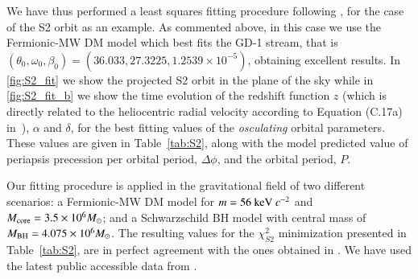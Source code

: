 \documentclass[twocolumn]{aa}
\begin{document}
We have thus performed a least squares fitting procedure following \cite{2020A&A...641A..34B}, for the case of the S2 orbit as an example. As commented above, in this case we use the Fermionic-MW DM model which best fits the GD-1 stream, that is $(\theta_0, \omega_0, \beta_0)= (36.033, 27.3225, 1.2539\times10^{-5})$, obtaining excellent results. In \cref{fig:S2_fit}  we show the projected S2 orbit in the plane of the sky while in \cref{fig:S2_fit_b} we show the time evolution of the redshift function $z$ (which is directly related to the heliocentric radial velocity according to Equation (C.17a) in~\citealp{2020A&A...641A..34B}), $\alpha$ and $\delta$, for the best fitting values of the \textit{osculating} orbital parameters. These values are given in Table~\ref{tab:S2}, along with the model predicted value of periapsis precession per orbital period, $\Delta \phi$, and the orbital period, $P$.

Our fitting procedure is applied in the gravitational field of two different scenarios: a Fermionic-MW DM model for $m=56~{\rm keV}~c^{-2}$ and $M_{\rm{core}}=3.5\times 10^6 M_\odot$; and a Schwarzschild BH model with central mass of $M_{\rm BH}=4.075\times 10^6 M_\odot$.
The resulting values for the $\chi^2_{S2}$ minimization presented in Table~\ref{tab:S2}, are in perfect agreement with the ones obtained in \cite{2020A&A...641A..34B}. 
We have used the latest public accessible data from \cite{2019Sci...365..664D}.
\end{document}
